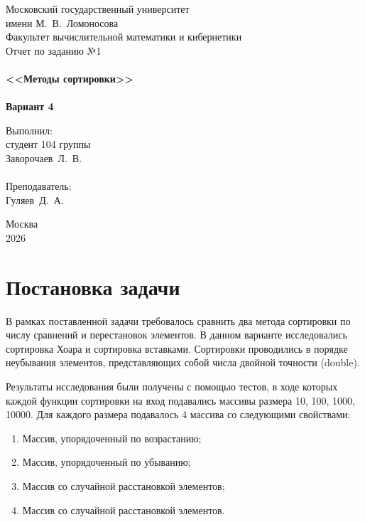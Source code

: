 \documentclass[a4paper,12pt,titlepage,finall]{article}
\begin{document}
\begin{titlepage}
    \begin{center}
	{\small \sc Московский государственный университет \\имени М.~В.~Ломоносова\\
	Факультет вычислительной математики и кибернетики\\}
	\vfill
	{\Large \sc Отчет по заданию №1}\\
	~\\
	{\large \bf <<Методы сортировки>>}\\ 
	~\\
	{\large \bf Вариант 4}
    \end{center}
    \begin{flushright}
	\vfill {Выполнил:\\
	студент 104 группы\\
	Заворочаев~Л.~В.\\
	~\\
	Преподаватель:\\
	Гуляев~Д.~А.}
    \end{flushright}
    \begin{center}
	\vfill
	{\small Москва\\2026}
    \end{center}
\end{titlepage}

\tableofcontents
\newpage

\section{Постановка задачи}

В рамках поставленной задачи требовалось сравнить два метода сортировки по числу сравнений и перестановок элементов. В данном варианте исследовались сортировка Хоара и сортировка вставками. Сортировки проводились в порядке неубывания элементов, представляющих собой числа двойной точности (double).

Результаты исследования были получены с помощью тестов, в ходе которых каждой функции сортировки на вход подавались массивы размера 10, 100, 1000, 10000. Для каждого размера подавалось 4 массива со следующими свойствами:
\begin{enumerate}
\item Массив, упорядоченный по возрастанию;
\item Массив, упорядоченный по убыванию;
\item Массив со случайной расстановкой элементов;
\item Массив со случайной расстановкой элементов. 
\end{enumerate}
\end{document}
